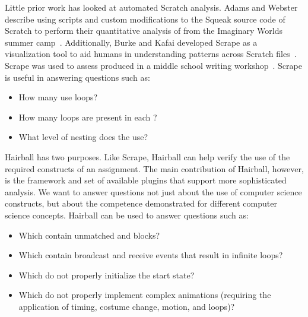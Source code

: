 Little prior work has looked at automated Scratch analysis.  Adams and Webster
describe using scripts and custom modifications to the Squeak source code of
Scratch to perform their quantitative analysis of  from the
Imaginary Worlds summer camp~\cite{Adams:2012:SLP:2157136.2157319}.
Additionally, Burke and Kafai developed Scrape as a visualization tool to aid
humans in understanding patterns across Scratch
files~\cite{scrape-poster}. Scrape was used to assess  produced in
a middle school writing workshop~\cite{Burke:2012:WWY:2157136.2157264}. Scrape
is useful in answering questions such as:
\begin{itemize}
\vspace*{-.025in}
\item How many  use loops?
\vspace*{-.025in}
\item How  many loops are present in each \sprogram{}?
\vspace*{-.025in}
\item What level of nesting does the \sprogram{} use?
\vspace*{-.025in}
\end{itemize}

Hairball has two purposes.  Like Scrape, Hairball can help verify the use of
the required constructs of an assignment.  The main contribution of Hairball,
however, is the framework and set of available plugins that support more
sophisticated analysis.  We want to answer questions not just about the use of
computer science constructs, but about the competence demonstrated for
different computer science concepts. Hairball can be used to answer questions
such as:
\begin{itemize}
\vspace*{-.025in}
\item Which  contain unmatched \broadcast{} and \receive{} blocks?
\vspace*{-.025in}
\item Which  contain broadcast and receive events that result in
  infinite loops?
\vspace*{-.025in}
\item Which  do not properly initialize the start state?
\vspace*{-.025in}
\item Which  do not properly implement complex animations
  (requiring the application of timing, costume change, motion, and loops)?
\vspace*{-.025in}
\end{itemize}
\vspace*{0.25in}
